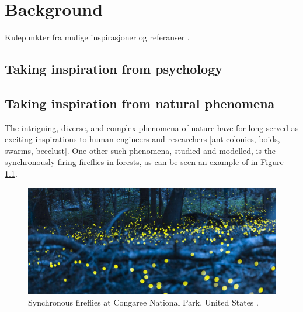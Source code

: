 \chapter{Background}
Kulepunkter  fra mulige inspirasjoner og referanser .




\section{Taking inspiration from psychology}







\section{Taking inspiration from natural phenomena}
The intriguing, diverse, and complex phenomena of nature have for long served as exciting inspirations to human engineers and researchers [ant-colonies, boids, swarms, beeclust]. One other such phenomena, studied and modelled, is the synchronously firing fireflies in forests, as can be seen an example of in Figure \ref{fig:synched_fireflies_phenomenon}.

\begin{figure}[!ht]
	\centering
	\includegraphics[width=0.9\linewidth]{Assets/Figures/synchronized_fireflies_phenomenon.jpg}
	\caption{Synchronous fireflies at Congaree National Park, United States \cite{synched_fireflies_phenomenon}.}
	\label{fig:synched_fireflies_phenomenon}
\end{figure}

